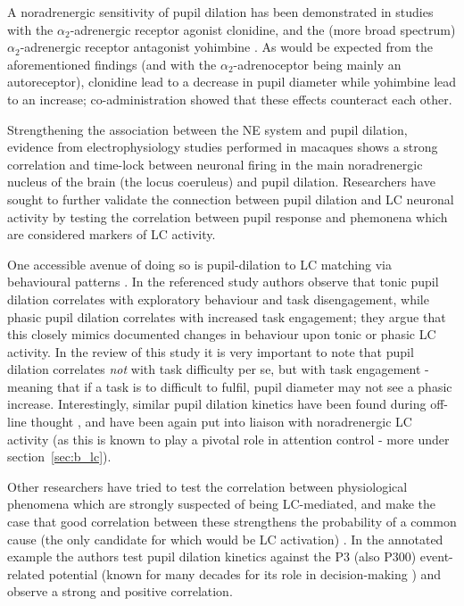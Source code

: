 	A noradrenergic sensitivity of pupil dilation has been demonstrated in studies with the $\alpha_2$-adrenergic receptor agonist clonidine, and the (more broad spectrum) $\alpha_2$-adrenergic receptor antagonist yohimbine \cite{Phillips2000}. 
	As would be expected from the aforementioned findings (and with the $\alpha_2$-adrenoceptor being mainly an autoreceptor), clonidine lead to a decrease in pupil diameter while yohimbine lead to an increase; co-administration showed that these effects counteract each other.
	
	Strengthening the association between the NE system and pupil dilation, evidence from electrophysiology studies performed in macaques \cite{Rajkowski1994} shows a strong correlation and time-lock between neuronal firing in the main noradrenergic nucleus of the brain (the locus coeruleus) and pupil dilation.
	Researchers have sought to further validate the connection between pupil dilation and LC neuronal activity by testing the correlation between pupil response and phemonena which are considered markers of LC activity.
	
	One accessible avenue of doing so is pupil-dilation to LC matching via behavioural patterns \cite{Gilzenrat2010}.
	In the referenced study authors observe that tonic pupil dilation correlates with exploratory behaviour and task disengagement, while phasic pupil dilation correlates with increased task engagement; they argue that this closely mimics documented \cite{Aston-Jones2005} changes in behaviour upon tonic or phasic LC activity.
	In the review of this study it is very important to note that pupil dilation correlates \textit{not} with task difficulty per se, but with task engagement - meaning that if a task is to difficult to fulfil, pupil diameter may not see a phasic increase.
	Interestingly, similar pupil dilation kinetics have been found during off-line thought \cite{Smallwood2011}, and have been again put into liaison with noradrenergic LC activity (as this is known to play a pivotal role in attention control - more under section~\ref{sec:b_lc}).   
	
	Other researchers have tried to test the correlation between physiological phenomena which are strongly suspected of being LC-mediated, and make the case that good correlation between these strengthens the probability of a common cause (the only candidate for which would be LC activation) \cite{Murphy2011}.
	In the annotated example the authors test pupil dilation kinetics against the P3 (also P300) event-related potential (known for many decades for its role in decision-making \cite{CHAPMAN1964}) and observe a strong and positive correlation.
	
